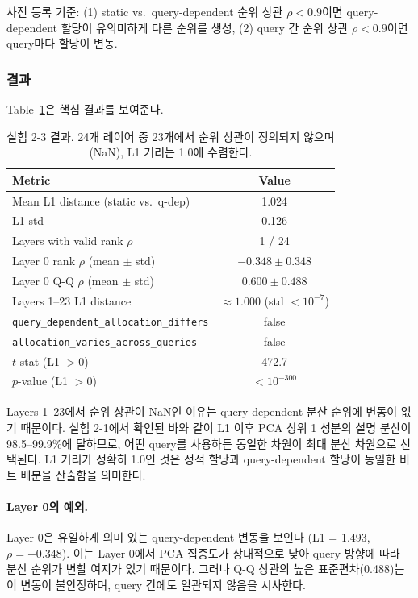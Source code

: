 \documentclass[11pt,a4paper]{article}
\begin{document}
사전 등록 기준: (1) static vs.\ query-dependent 순위 상관 $\rho < 0.9$이면 query-dependent 할당이 유의미하게 다른 순위를 생성, (2) query 간 순위 상관 $\rho < 0.9$이면 query마다 할당이 변동.

\subsubsection{결과}

Table~\ref{tab:exp23_main}은 핵심 결과를 보여준다.

\begin{table}[H]
\centering
\caption{실험 2-3 결과. 24개 레이어 중 23개에서 순위 상관이 정의되지 않으며(NaN), L1 거리는 1.0에 수렴한다.}
\label{tab:exp23_main}
\begin{tabular}{lc}
\toprule
\textbf{Metric} & \textbf{Value} \\
\midrule
Mean L1 distance (static vs.\ q-dep) & 1.024 \\
L1 std & 0.126 \\
Layers with valid rank $\rho$ & 1 / 24 \\
Layer 0 rank $\rho$ (mean $\pm$ std) & $-0.348 \pm 0.348$ \\
Layer 0 Q-Q $\rho$ (mean $\pm$ std) & $0.600 \pm 0.488$ \\
Layers 1--23 L1 distance & $\approx 1.000$ (std $< 10^{-7}$) \\
\texttt{query\_dependent\_allocation\_differs} & false \\
\texttt{allocation\_varies\_across\_queries} & false \\
$t$-stat (L1 $> 0$) & 472.7 \\
$p$-value (L1 $> 0$) & $< 10^{-300}$ \\
\bottomrule
\end{tabular}
\end{table}

Layers 1--23에서 순위 상관이 NaN인 이유는 query-dependent 분산 순위에 변동이 없기 때문이다.
실험 2-1에서 확인된 바와 같이 L1 이후 PCA 상위 1 성분의 설명 분산이 98.5--99.9\%에 달하므로, 어떤 query를 사용하든 동일한 차원이 최대 분산 차원으로 선택된다.
L1 거리가 정확히 1.0인 것은 정적 할당과 query-dependent 할당이 동일한 비트 배분을 산출함을 의미한다.

\paragraph{Layer 0의 예외.}
Layer 0은 유일하게 의미 있는 query-dependent 변동을 보인다 (L1 = 1.493, $\rho = -0.348$).
이는 Layer 0에서 PCA 집중도가 상대적으로 낮아 query 방향에 따라 분산 순위가 변할 여지가 있기 때문이다.
그러나 Q-Q 상관의 높은 표준편차(0.488)는 이 변동이 불안정하며, query 간에도 일관되지 않음을 시사한다.
\end{document}
